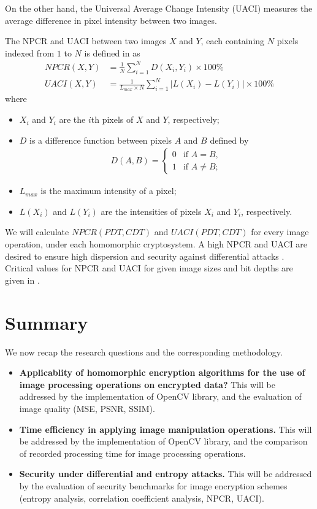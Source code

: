 \begin{description}
		On the other hand, the Universal Average Change Intensity (UACI) measures the average difference in pixel intensity between two images.

		The NPCR and UACI between two images $X$ and $Y$, each containing $N$ pixels indexed from $1$ to $N$ is defined in \cite{wu_npcr_2011} as
		\begin{align}
			NPCR(X,Y) &= \frac{1}{N}\sum_{i = 1}^{N}{D(X_i,Y_i)} \times 100\%\\
			UACI(X,Y) &= \frac{1}{L_{max} \times N} \sum_{i = 1}^{N}{ |L(X_i) - L(Y_i)| } \times 100\%
		\end{align}
		where
		\begin{itemize}
			\item $X_i$ and $Y_i$ are the $i$th pixels of $X$ and $Y$, respectively;
			\item $D$ is a difference function between pixels $A$ and $B$ defined by
			\begin{align}
				D(A,B) =
				\begin{cases}
					0 &  \text{if $A = B$},\\
					1 &  \text{if $A \neq B$};
				\end{cases}
			\end{align}
		\item $L_{max}$ is the maximum intensity of a pixel;
		\item $L(X_i)$ and $L(Y_i)$ are the intensities of pixels $X_i$ and $Y_i$, respectively.
		\end{itemize}
		We will calculate $NPCR(PDT,CDT)$ and $UACI(PDT,CDT)$  for every image operation, under each homomorphic cryptosystem. A high NPCR and UACI are desired to ensure high dispersion and security against differential attacks \cite{ahmed_benchmark_2016}. Critical values for NPCR and UACI for given image sizes and bit depths are given in  \cite{wu_npcr_2011}.
\end{description}

\section{Summary}

We now recap the research questions and the corresponding methodology.
\begin{itemize}
	\item \textbf{Applicablity of homomorphic encryption algorithms for the use of image processing operations on encrypted data?} This will be addressed by the implementation of OpenCV library, and the evaluation of image quality (MSE, PSNR, SSIM).
	\item \textbf{Time efficiency in applying image manipulation operations.} This will be addressed by the implementation of OpenCV library, and the comparison of recorded processing time for image processing operations.
	\item \textbf{Security under differential and entropy attacks.}
	This will be addressed by the evaluation of security benchmarks for image encryption schemes (entropy analysis, correlation coefficient analysis, NPCR, UACI).
\end{itemize}
